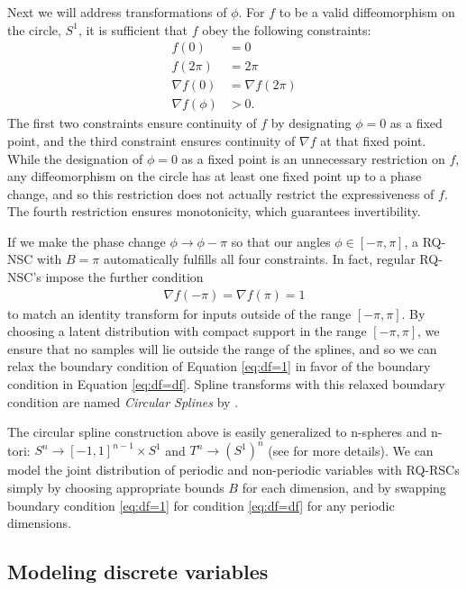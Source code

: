 \documentclass[twocolumn,twocolappendix]{aastex631}
\begin{document}
Next we will address transformations of $\phi$.
For $f$ to be a valid diffeomorphism on the circle, $S^1$, it is sufficient that $f$ obey the following constraints:
\begin{align}
    f(0) &= 0 \\
    f(2\pi) &= 2\pi \\
    \nabla f(0) &= \nabla f(2\pi) \label{eq:df=df} \\
    \nabla f(\phi) &> 0.
\end{align}
The first two constraints ensure continuity of $f$ by designating $\phi=0$ as a fixed point, and the third constraint ensures continuity of $\nabla f$ at that fixed point.
While the designation of $\phi=0$ as a fixed point is an unnecessary restriction on $f$, any diffeomorphism on the circle has at least one fixed point up to a phase change, and so this restriction does not actually restrict the expressiveness of $f$.
The fourth restriction ensures monotonicity, which guarantees invertibility.

If we make the phase change $\phi \to \phi - \pi$ so that our angles $\phi \in [-\pi, \pi]$, a RQ-NSC with $B=\pi$ automatically fulfills all four constraints.
In fact, regular RQ-NSC's impose the further condition
\begin{align}
    \nabla f(-\pi) = \nabla f(\pi) = 1 \label{eq:df=1}
\end{align}
to match an identity transform for inputs outside of the range $[-\pi, \pi]$.
By choosing a latent distribution with compact support in the range $[-\pi, \pi]$, we ensure that no samples will lie outside the range of the splines, and so we can relax the boundary condition of Equation \ref{eq:df=1} in favor of the boundary condition in Equation \ref{eq:df=df}.
Spline transforms with this relaxed boundary condition are named \emph{Circular Splines} by \citet{rezende2020}.

The circular spline construction above is easily generalized to n-spheres and n-tori: $S^n \to [-1, 1]^{n-1} \times S^1$ and $T^n \to (S^1)^n$ (see \citealt{rezende2020} for more details).
We can model the joint distribution of periodic and non-periodic variables with RQ-RSCs simply by choosing appropriate bounds $B$ for each dimension, and by swapping boundary condition \ref{eq:df=1} for condition \ref{eq:df=df} for any periodic dimensions.


\subsection{Modeling discrete variables}
\label{sec:discrete}
\end{document}
